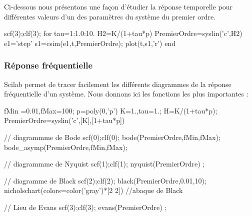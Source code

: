 Ci-dessous nous présentons une façon d'étudier la réponse temporelle pour
différentes valeurs d'un des paramètres du système du premier ordre.
\begin{Scilabcode}
scf(3);clf(3);
for tau=1:1.0:10.
    H2=K/(1+tau*p)
    PremierOrdre=syslin('c',H2)
    e1='step'
    s1=csim(e1,t,PremierOrdre);
    plot(t,s1,'r')
end
\end{Scilabcode}


\subsubsection{Réponse fréquentielle}
Scilab permet de tracer facilement les différents diagrammes de la réponse 
fréquentielle d'un système. Nous donnons ici les fonctions les 
plus importantes : 
\begin{Scilabcode}
fMin =0.01,fMax=100;
p=poly(0,'p')
K=1.,tau=1.;
H=K/(1+tau*p);
PremierOrdre=syslin('c',[K],[1+tau*p])

// diagrammme de Bode
scf(0);clf(0);
bode(PremierOrdre,fMin,fMax); bode_asymp(PremierOrdre,fMin,fMax);

// diagrammme de Nyquist
scf(1);clf(1);
nyquist(PremierOrdre) ;

// diagramme de Black
scf(2);clf(2);
black(PremierOrdre,0.01,10);
nicholschart(colors=color('gray')*[2 2]) //abaque de Black

// Lieu de Evans
scf(3);clf(3);
evans(PremierOrdre) ;
\end{Scilabcode}

